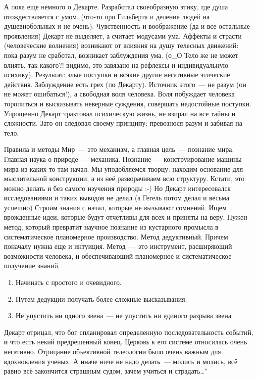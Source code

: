 А пока еще немного о Декарте.
Разработал своеобразную этику, где душа отождествляется с умом. (что-то про Гильберта и деление людей на душевнобольных и не очень). Чувственность и воображение (да и все остальные проявления) Декарт не выделяет, а считает модусами ума. Аффекты и страсти (человеческие волнения) возникают от влияния на душу телесных движений: пока разум не сработал, возникает заблуждения ума. (о\_О Тело же не может влиять, так какого?! видимо, это завязано на рефлексы и индивидуальную психику). Результат: злые поступки и всякие другие негативные этические действия. Заблуждение есть грех (по Декарту). Источник этого~--- не разум (он не может ошибаться!), а свободная воля человека. Воля побуждает человека торопиться и высказывать неверные суждения, совершать недостойные поступки. Упрощенно Декарт трактовал психическую жизнь, не взирал на все тайны и сложности. Зато он следовал своему принципу: превознося разум и забивая на тело.

Правила и методы
Мир~--- это механизм, а главная цель~--- познание мира. Главная наука о природе~--- механика. Познание~--- конструирование машины мира из каких-то там начал. Мы уподобляемся творцу: находим основание для мыслительной конструкции, а из неё разворачиваем всю структуру. Кстати, это можно делать и без самого изучения природы :-) Но Декарт интересовался исследованиями и таких выводов не делал (а Гегель потом делал и весьма успешно) 
Строим знания с начал, которые не вызывают сомнений. Ищем врожденные идеи, которые будут отчетливы для всех и приняты на веру. Нужен метод, который превратит научное познание из кустарного промысла в систематическое планомерное производство. Метод дедуктивный. Причем поначалу нужна еще и интуиция. Метод~--- это инструмент, расширяющий возможности человека, и обеспечивающий планомерное и систематическое получение знаний.
\begin{enumerate}
	\item Начинать с простого и очевидного. 
	\item Путем дедукции получать более сложные высказывания. 
	\item Не упустить ни одного звена~--- не упустить ни единого разрыва звена
\end{enumerate}

Декарт отрицал, что бог спланировал определенную последовательность событий, и что есть некий предрешенный конец. Церковь к его системе относилась очень негативно. Отрицание объективной телеологии было очень важным для вдохновления ученых. А иначе ниче не надо делать~--- молись и молись, всё равно всё закончится страшным судом, зачем учиться и страдать\ldots"

